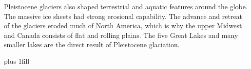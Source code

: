 \documentclass{tufte-handout}
\begin{document}
Pleistocene glaciers also shaped terrestrial and aquatic features around the globe. The massive ice sheets had strong erosional capability. The advance and retreat of the glaciers eroded much of North America, which is why the upper Midwest and Canada consists of flat and rolling plains.   The five Great Lakes and many smaller lakes are the direct result of Pleistocene glaciation.  


\vskip0pt plus 1fill

\phantom{made you look}
\end{document}
